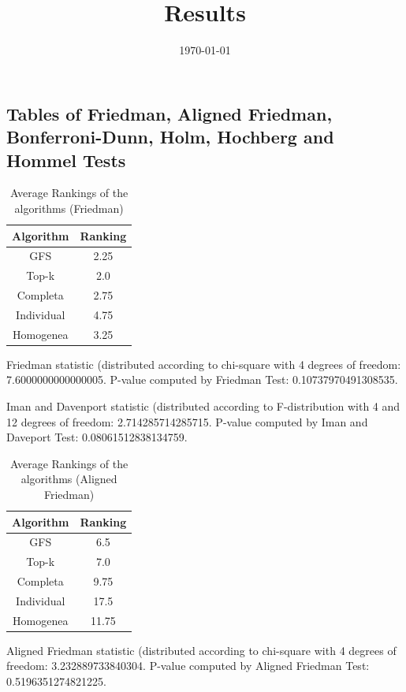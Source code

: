 \documentclass[a4paper,10pt]{article}
\title{Results}
\author{}
\date{\today}
\begin{document}
\begin{landscape}
\oddsidemargin 0in \topmargin 0in\maketitle
\section{Tables of Friedman, Aligned Friedman, Bonferroni-Dunn, Holm, Hochberg and Hommel Tests}
\begin{table}[!htp]
\centering
\caption{Average Rankings of the algorithms (Friedman)
}\begin{tabular}{c|c}
Algorithm&Ranking\\
\hline
GFS&2.25\\
Top-k&2.0\\
Completa&2.75\\
Individual&4.75\\
Homogenea&3.25\\
\end{tabular}
\end{table}


Friedman statistic (distributed according to chi-square with 4 degrees of freedom: 7.6000000000000005. 
P-value computed by Friedman Test: 0.10737970491308535.\newline

Iman and Davenport statistic (distributed according to F-distribution with 4 and 12 degrees of freedom: 2.714285714285715. 
P-value computed by Iman and Daveport Test: 0.08061512838134759.\newline


\newpage

\begin{table}[!htp]
\centering
\caption{Average Rankings of the algorithms (Aligned Friedman)
}\begin{tabular}{c|c}
Algorithm&Ranking\\
\hline
GFS&6.5\\
Top-k&7.0\\
Completa&9.75\\
Individual&17.5\\
Homogenea&11.75\\
\end{tabular}
\end{table}


Aligned Friedman statistic (distributed according to chi-square with 4 degrees of freedom: 3.232889733840304. 
P-value computed by Aligned Friedman Test: 0.5196351274821225.\newline



\end{landscape}
\end{document}
